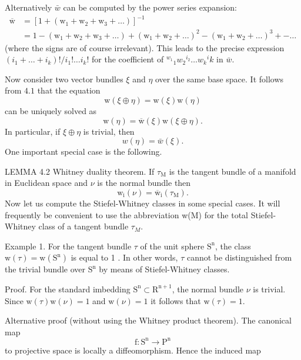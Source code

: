 \documentclass[10pt]{article}
\begin{document}
Alternatively $\bar{w}$ can be computed by the power series expansion:
$$
\begin{aligned}
\overline{\mathrm{w}} &=\left[1+\left(\mathrm{w}_{1}+\mathrm{w}_{2}+\mathrm{w}_{3}+\ldots\right)\right]^{-1} \\
&=1-\left(\mathrm{w}_{1}+\mathrm{w}_{2}+\mathrm{w}_{3}+\ldots\right)+\left(\mathrm{w}_{1}+\mathrm{w}_{2}+\ldots\right)^{2}-\left(\mathrm{w}_{1}+\mathrm{w}_{2}+\ldots\right)^{3}+-\ldots
\end{aligned}
$$
(where the signs are of course irrelevant). This leads to the precise expression $\left(i_{1}+\ldots+i_{k}\right) ! / i_{1} ! \ldots i_{k} !$ for the coefficient of ${ }^{w_{1}}{ }_{1} w_{2}{ }^{i_{2}} \ldots w_{k}{ }^{i} k$ in $\bar{w}$.

Now consider two vector bundles $\xi$ and $\eta$ over the same base space. It follows from $4.1$ that the equation
$$
\mathrm{w}(\xi \oplus \eta)=\mathrm{w}(\xi) \mathrm{w}(\eta)
$$
can be uniquely solved as
$$
\mathrm{w}(\eta)=\overline{\mathrm{w}}(\xi) \mathrm{w}(\xi \oplus \eta) .
$$
In particular, if $\xi \oplus \eta$ is trivial, then
$$
w(\eta)=\bar{w}(\xi) .
$$
One important special case is the following.

LEMMA 4.2 Whitney duality theorem. If $\tau_{\mathrm{M}}$ is the tangent bundle of a manifold in Euclidean space and $\nu$ is the normal bundle then
$$
\mathrm{w}_{\mathrm{i}}(\nu)=\overline{\mathrm{w}}_{\mathrm{i}}\left(\tau_{\mathrm{M}}\right) .
$$
Now let us compute the Stiefel-Whitney classes in some special cases. It will frequently be convenient to use the abbreviation w(M) for the total Stiefel-Whitney class of a tangent bundle $\tau_{M}$.

Example 1. For the tangent bundle $\tau$ of the unit sphere $\mathrm{S}^{\mathrm{n}}$, the class $\mathrm{w}(\tau)=\mathrm{w}\left(\mathrm{S}^{\mathrm{n}}\right)$ is equal to 1 . In other words, $\tau$ cannot be distinguished from the trivial bundle over $\mathrm{S}^{\mathrm{n}}$ by means of Stiefel-Whitney classes.

Proof. For the standard imbedding $\mathrm{S}^{\mathrm{n}} \subset \mathrm{R}^{\mathrm{n}+1}$, the normal bundle $\nu$ is trivial. Since $\mathrm{w}(\tau) \mathrm{w}(\nu)=1$ and $\mathrm{w}(\nu)=1$ it follows that $\mathrm{w}(\tau)=1$.

Alternative proof (without using the Whitney product theorem). The canonical map
$$
\mathrm{f}: \mathrm{S}^{\mathrm{n}} \rightarrow \mathrm{P}^{\mathrm{n}}
$$
to projective space is locally a diffeomorphism. Hence the induced map
\end{document}
